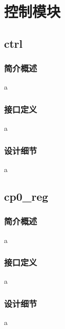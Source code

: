\chapter{控制模块}

\section{ctrl}

    \subsection{简介概述}
    a

    \subsection{接口定义}
    a

    \subsection{设计细节}
    a

\section{cp0\_reg}

    \subsection{简介概述}
    a

    \subsection{接口定义}
    a

    \subsection{设计细节}
    a

